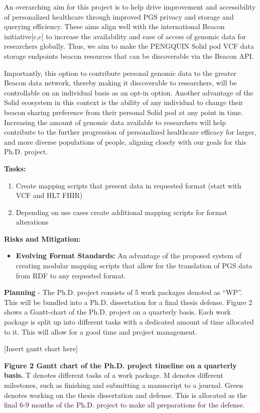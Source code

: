 \documentclass{article}
\begin{document}
An overarching aim for this project is to help drive improvement and accessibility of personalized healthcare through improved PGS privacy and storage and querying efficiency. These aims align well with the international Beacon initiative[c,c] to increase the availability and ease of access of genomic data for researchers globally. Thus, we aim to make the PENGQUIN Solid pod VCF data storage endpoints beacon resources that can be discoverable via the Beacon API.

Importantly, this option to contribute personal genomic data to the greater Beacon data network, thereby making it discoverable to researchers, will be controllable on an individual basis as an opt-in option. Another advantage of the Solid ecosystem in this context is the ability of any individual to change their beacon sharing preference from their personal Solid pod at any point in time. Increasing the amount of genomic data available to researchers will help contribute to the further progression of personalized healthcare efficacy for larger, and more diverse populations of people, aligning closely with our goals for this Ph.D. project.

\textbf{Tasks:} 
\begin{enumerate}
	\item Create mapping scripts that present data in requested format (start with VCF and HL7 FHIR)
	\item Depending on use cases create additional mapping scripts for format alterations
\end{enumerate}

\textbf{Risks and Mitigation:} 
\begin{itemize}
	\item \textbf{Evolving Format Standards:} An advantage of the proposed system of creating modular mapping scripts that allow for the translation of PGS data from RDF to any requested format. 
\end{itemize}

\textbf{Planning} - The Ph.D. project consists of 5 work packages denoted as “WP”. This will be bundled into a Ph.D. dissertation for a final thesis defense. Figure 2 shows a Gantt-chart of the Ph.D. project on a quarterly basis.  Each work package is split up into different tasks with a dedicated amount of time allocated to it. This will allow for a good time and project management. 

[Insert gantt chart here]

\textbf{Figure 2 Gantt chart of the Ph.D. project timeline on a quarterly basis.} T denotes different tasks of a work package. M denotes different milestones, such as finishing and submitting a manuscript to a journal. Green denotes working on the thesis dissertation and defense. This is allocated as the final 6-9 months of the Ph.D. project to make all preparations for the defense. 
\end{document}
